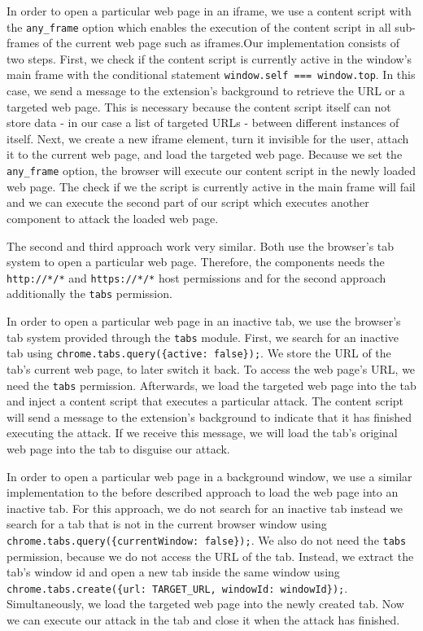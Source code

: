 	In order to open a particular web page in an iframe, we use a content script with the \texttt{any\_frame} option which enables the execution of the content script in all sub-frames of the current web page such as iframes.Our implementation consists of two steps. First, we check if the content script is currently active in the window's main frame with the conditional statement \lstinline|window.self === window.top|. In this case, we send a message to the extension's background to retrieve the URL or a targeted web page. This is necessary because the content script itself can not store data - in our case a list of targeted URLs - between different instances of itself. Next, we create a new iframe element, turn it invisible for the user, attach it to the current web page, and load the targeted web page. Because we set the \texttt{any\_frame} option, the browser will execute our content script in the newly loaded web page. The check if we the script is currently active in the main frame will fail and we can execute the second part of our script which executes another component to attack the loaded web page.
	
	The second and third approach work very similar. Both use the browser's tab system to open a particular web page. Therefore, the components needs the \texttt{http://*/*} and \texttt{https://*/*} host permissions and for the second approach additionally the \texttt{tabs} permission.
	
	In order to open a particular web page in an inactive tab, we use the browser's tab system provided through the \texttt{tabs} module. First, we search for an inactive tab using \lstinline|chrome.tabs.query({active: false});|. We store the URL of the tab's current web page, to later switch it back. To access the web page's URL, we need the \texttt{tabs} permission. Afterwards, we load the targeted web page into the tab and inject a content script that executes a particular attack. The content script will send a message to the extension's background to indicate that it has finished executing the attack. If we receive this message, we will load the tab's original web page into the tab to disguise our attack.
	
	In order to open a particular web page in a background window, we use a similar implementation to the before described approach to load the web page into an inactive tab. For this approach, we do not search for an inactive tab instead we search for a tab that is not in the current browser window using \lstinline|chrome.tabs.query({currentWindow: false});|. We also do not need the \texttt{tabs} permission, because we do not access the URL of the tab. Instead, we extract the tab's window id and open a new tab inside the same window using \lstinline|chrome.tabs.create({url: TARGET_URL, windowId: windowId});|. Simultaneously, we load the targeted web page into the newly created tab. Now we can execute our attack in the tab and close it when the attack has finished.
	
